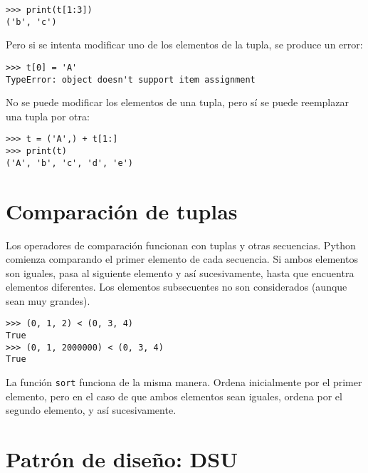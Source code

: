  
 


\begin{Verbatim}[frame=single]
>>> print(t[1:3])
('b', 'c')
\end{Verbatim}


Pero si se intenta modificar uno de los elementos de la tupla, se
produce un error:

 
 


\begin{Verbatim}[frame=single]
>>> t[0] = 'A'
TypeError: object doesn't support item assignment
\end{Verbatim}


No se puede modificar los elementos de una tupla, pero sí se puede
reemplazar una tupla por otra:


\begin{Verbatim}[frame=single]
>>> t = ('A',) + t[1:]
>>> print(t)
('A', 'b', 'c', 'd', 'e')
\end{Verbatim}


\hypertarget{comparaciuxf3n-de-tuplas}{%
\section{Comparación de tuplas}\label{comparaciuxf3n-de-tuplas}}

 
 

Los operadores de comparación funcionan con tuplas y otras secuencias.
Python comienza comparando el primer elemento de cada secuencia. Si
ambos elementos son iguales, pasa al siguiente elemento y así
sucesivamente, hasta que encuentra elementos diferentes. Los elementos
subsecuentes no son considerados (aunque sean muy grandes).


\begin{Verbatim}[frame=single]
>>> (0, 1, 2) < (0, 3, 4)
True
>>> (0, 1, 2000000) < (0, 3, 4)
True
\end{Verbatim}

La función \texttt{sort} funciona de la misma manera. Ordena inicialmente por el primer elemento, pero en el caso de que ambos
elementos sean iguales, ordena por el segundo elemento, y así sucesivamente.


\section{Patrón de diseño: DSU}\label{DSU}

